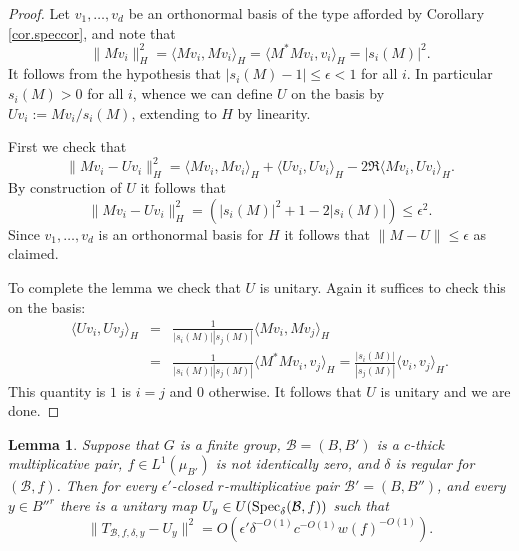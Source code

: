 \documentclass[12pt]{amsart}
\numberwithin{equation}{section}
\theoremstyle{plain}
\newtheorem{lemma}[subsection]{Lemma}
\theoremstyle{definition}
\renewcommand{\leq}{\leqslant}
\providecommand{\Spec}{\mathop{\rm Spec}\nolimits}
\begin{document}
\begin{proof}
Let $v_1,\dots,v_d$ be an orthonormal basis of the type afforded by Corollary \ref{cor.speccor}, and note that
\begin{equation*}
\|Mv_i\|_H^2=\langle Mv_i,Mv_i\rangle_H = \langle M^*Mv_i,v_i\rangle_H = |s_i(M)|^2.
\end{equation*}
It follows from the hypothesis that $|s_i(M)-1| \leq \epsilon<1$ for all $i$.  In particular $s_i(M)>0$ for all $i$, whence we can define $U$ on the basis by $Uv_i:=Mv_i/s_i(M)$, extending to $H$ by linearity. 

First we check that
\begin{equation*}
\|Mv_i-Uv_i\|_H^2=\langle Mv_i,Mv_i\rangle_H + \langle Uv_i,Uv_i\rangle_H - 2\Re \langle Mv_i,Uv_i\rangle_H.
\end{equation*}
By construction of $U$ it follows that
\begin{equation*}
\|Mv_i-Uv_i\|_H^2=(|s_i(M)|^2+1-2|s_i(M)|)\leq \epsilon^2.
\end{equation*}
Since $v_1,\dots,v_d$ is an orthonormal basis for $H$ it follows that $\|M-U\| \leq \epsilon$ as claimed.

To complete the lemma we check that $U$ is unitary.  Again it suffices to check this on the basis:
\begin{eqnarray*}
\langle Uv_i,Uv_j\rangle_H& =& \frac{1}{|s_i(M)||s_j(M)|}\langle Mv_i,Mv_j\rangle_H\\ & =& \frac{1}{|s_i(M)||s_j(M)|}\langle M^*Mv_i,v_j\rangle_H =\frac{|s_i(M)|}{|s_j(M)|}\langle v_i,v_j\rangle_H.
\end{eqnarray*}
This quantity is $1$ is $i=j$ and $0$ otherwise.  It follows that $U$ is unitary and we are done.
\end{proof}
\begin{lemma}\label{lem.un}
Suppose that $G$ is a finite group, $\mathcal{B}=(B,B')$ is a $c$-thick multiplicative pair, $f \in L^1(\mu_{B'})$ is not identically zero, and $\delta$ is regular for $(\mathcal{B},f)$. Then for every $\epsilon'$-closed $r$-multiplicative pair $\mathcal{B}'=(B,B'')$, and every $y \in B''^r$ there is a unitary map $U_y \in U(\Spec_\delta(\mathcal{B},f))$ such that
\begin{equation*}
\|T_{\mathcal{B},f,\delta,y} - U_y\|^2 = O(\epsilon'\delta^{-O(1)}c^{-O(1)}w(f)^{-O(1)}).
\end{equation*}
\end{lemma}
\end{document}
